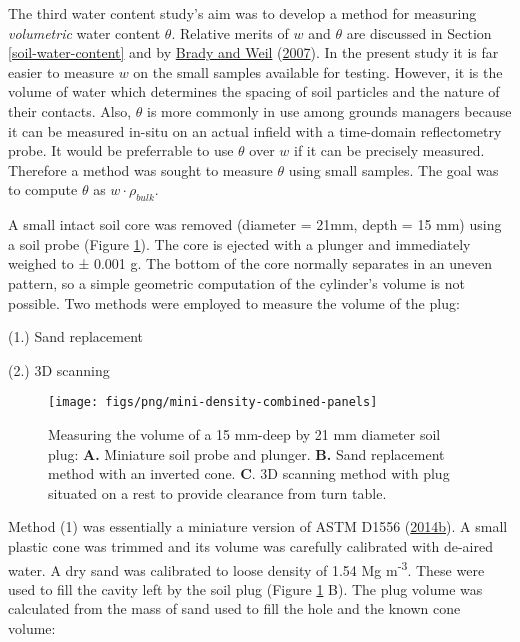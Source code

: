 \documentclass[
  letterpaper,
  openany]{book}
\begin{document}
The third water content study's aim was to develop a method for measuring \emph{volumetric} water content \(\theta\).
Relative merits of \(w\) and \(\theta\) are discussed in Section \ref{soil-water-content} and by \protect\hyperlink{ref-Brady2007}{Brady and Weil} (\protect\hyperlink{ref-Brady2007}{2007}).
In the present study it is far easier to measure \(w\) on the small samples available for testing.
However, it is the volume of water which determines the spacing of soil particles and the nature of their contacts.
Also, \(\theta\) is more commonly in use among grounds managers because it can be measured in-situ on an actual infield with a time-domain reflectometry probe.
It would be preferrable to use \(\theta\) over \(w\) if it can be precisely measured.
Therefore a method was sought to measure \(\theta\) using small samples.
The goal was to compute \(\theta\) as \(w \cdot \rho_{bulk}\).

A small intact soil core was removed (diameter = 21mm, depth = 15 mm) using a soil probe (Figure \ref{fig:mini-density-panels}).
The core is ejected with a plunger and immediately weighed to ± 0.001 g.
The bottom of the core normally separates in an uneven pattern, so a simple geometric computation
of the cylinder's volume is not possible.
Two methods were employed to measure the volume of the plug:

(1.) Sand replacement

(2.) 3D scanning

\begin{figure}

{\centering \texttt{[image: figs/png/mini-density-combined-panels]} 

}

\caption[Measuring the volume of miniature soil plugs]{Measuring the volume of a 15 mm-deep by 21 mm diameter soil plug: \textbf{A.} Miniature soil probe and plunger. \textbf{B.} Sand replacement method with an inverted cone. \textbf{C}. 3D scanning method with plug situated on a rest to provide clearance from turn table.}\label{fig:mini-density-panels}
\end{figure}

Method (1) was essentially a miniature version of ASTM D1556 (\protect\hyperlink{ref-ASTMD1556-07}{2014b}).
A small plastic cone was trimmed and its volume was carefully calibrated with de-aired water.
A dry sand was calibrated to loose density of 1.54 Mg m\textsuperscript{-3}.
These were used to fill the cavity left by the soil plug (Figure \ref{fig:mini-density-panels} B).
The plug volume was calculated from the mass of sand used to fill the hole and the known cone volume:
\end{document}
